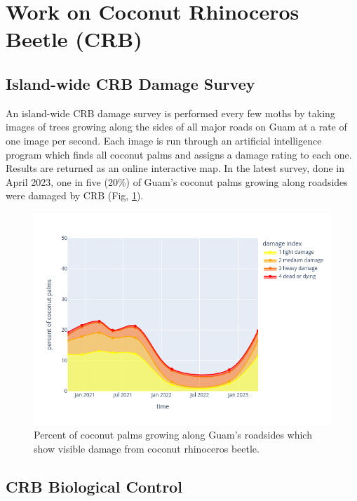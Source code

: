 \documentclass[twocolumn]{scrartcl}
\begin{document}
\section{Work on Coconut Rhinoceros Beetle (CRB)}

\subsection{Island-wide CRB Damage Survey}

An island-wide CRB damage survey is performed every few moths by taking images of trees growing along the sides of all major roads on Guam at a rate of one image per second. Each image is run through an artificial intelligence program which finds all coconut palms and assigns a damage rating to each one. Results are returned as an online interactive map. In the latest survey, done in April 2023, one in five (20\%) of Guam's coconut palms growing along roadsides were damaged by CRB \cite{moorePressRelease2023} (Fig, \ref{fig:timeline}).

\begin{figure}[H]
	\centering
	\includegraphics[width=1\linewidth]{images/timeline}
	\caption{Percent of coconut palms growing along Guam's roadsides which show visible damage from coconut rhinoceros beetle.}
	\label{fig:timeline}
\end{figure}

\subsection{CRB Biological Control}
\end{document}
